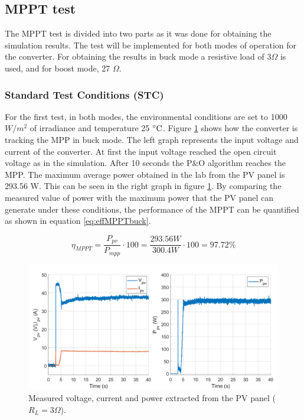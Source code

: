 \subsection{MPPT test}
The MPPT test is divided into two parts as it was done for obtaining the simulation results. The test will be implemented for both modes of operation for the converter. For obtaining the results in buck mode a resistive load of 3$\Omega$ is used, and for boost mode, 27 $\Omega$.

 \subsubsection*{Standard Test Conditions (STC)}
For the first test, in both modes, the environmental conditions are set to 1000 $W /m^2$ of irradiance and temperature 25 $\decC$. Figure \ref{MPPTtestbuckmode1} shows how the converter is tracking the MPP in buck mode. The left graph represents the input voltage and current of the converter. At first the input voltage reached the open circuit voltage as in the simulation.  After 10 seconds the P\&O algorithm reaches the MPP. The maximum average power obtained in the lab from the PV panel is 293.56 W. This can be seen in the right graph in figure \ref{MPPTtestbuckmode1}. By comparing the measured value of power with the maximum power that the PV panel can generate under these conditions, the performance of the MPPT can be quantified as shown in equation \ref{eq:effMPPTbuck}.

\begin{equation} \label{eq:effMPPTbuck}
\eta_{MPPT}= \dfrac{P_{pv}}{P_{mpp}} \cdot 100 = \dfrac{293.56W}{300.4W} \cdot 100 = 97.72\%  
\end{equation}


\begin{figure}[H]
	\begin{center}
		\includegraphics[width=1\textwidth]{../Pictures/P1/Test/Buck_mode_MPPT_Vin_Iin_Pin}
		\caption{Measured voltage, current and power extracted from the PV panel ($R_{L}=3\Omega$).}
		\label{MPPTtestbuckmode1}
	\end{center}	
\end{figure}

